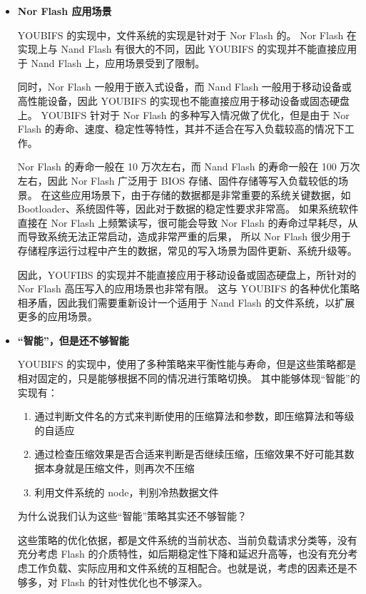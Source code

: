 \begin{itemize}
  \item {\bf{Nor Flash 应用场景}}
    
  YOUBIFS 的实现中，文件系统的实现是针对于 Nor Flash 的。
  Nor Flash 在实现上与 Nand Flash 有很大的不同，因此 YOUBIFS 的实现并不能直接应用于 Nand Flash 上，应用场景受到了限制。
  
  同时，Nor Flash 一般用于嵌入式设备，而 Nand Flash 一般用于移动设备或高性能设备，因此 YOUBIFS 的实现也不能直接应用于移动设备或固态硬盘上。
  YOUBIFS 针对于 Nor Flash 的多种写入情况做了优化，但是由于 Nor Flash 的寿命、速度、稳定性等特性，其并不适合在写入负载较高的情况下工作。

  Nor Flash 的寿命一般在 10 万次左右，而 Nand Flash 的寿命一般在 100 万次左右\cite{cai_program_2013}，因此 Nor Flash 广泛用于 BIOS 存储、固件存储等写入负载较低的场景。
  在这些应用场景下，由于存储的数据都是非常重要的系统关键数据，如 Bootloader、系统固件等，因此对于数据的稳定性要求非常高。
  如果系统软件直接在 Nor Flash 上频繁读写，很可能会导致 Nor Flash 的寿命过早耗尽，从而导致系统无法正常启动，造成非常严重的后果，
  所以 Nor Flash 很少用于存储程序运行过程中产生的数据，常见的写入场景为固件更新、系统升级等。

  因此，YOUFIBS 的实现并不能直接应用于移动设备或固态硬盘上，所针对的 Nor Flash 高压写入的应用场景也非常有限。
  这与 YOUBIFS 的各种优化策略相矛盾，因此我们需要重新设计一个适用于 Nand Flash 的文件系统，以扩展更多的应用场景。

  \item {\bf{“智能”，但是还不够智能}}

  YOUBIFS 的实现中，使用了多种策略来平衡性能与寿命，但是这些策略都是相对固定的，只是能够根据不同的情况进行策略切换。
  其中能够体现“智能”的实现有：

  \begin{enumerate}
    \item 通过判断文件名的方式来判断使用的压缩算法和参数，即压缩算法和等级的自适应
    \item 通过检查压缩效果是否合适来判断是否继续压缩，压缩效果不好可能其数据本身就是压缩文件，则再次不压缩
    \item 利用文件系统的 node，判别冷热数据文件
  \end{enumerate}

  为什么说我们认为这些“智能”策略其实还不够智能？
  
  这些策略的优化依据，都是文件系统的当前状态、当前负载请求分类等，没有充分考虑 Flash 的介质特性，如后期稳定性下降和延迟升高等，也没有充分考虑工作负载、实际应用和文件系统的互相配合。也就是说，考虑的因素还是不够多，对 Flash 的针对性优化也不够深入。


\end{itemize}
